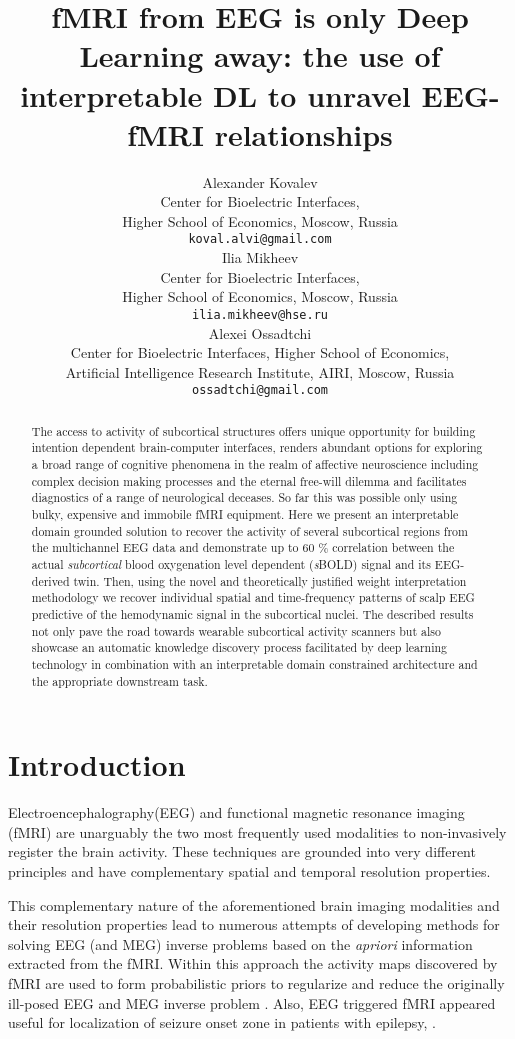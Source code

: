 \documentclass{article}
\title{ fMRI from EEG is only Deep Learning away: the use of interpretable DL to unravel EEG-fMRI relationships
}
\author{Alexander Kovalev\\
Center for Bioelectric Interfaces, \\ Higher School of Economics, Moscow, Russia \\  \texttt{koval.alvi@gmail.com} \\
   \And
   Ilia Mikheev\\
    Center for Bioelectric Interfaces, \\ Higher School of Economics, Moscow, Russia \\   \texttt{ilia.mikheev@hse.ru} \\
   \And
   Alexei Ossadtchi  \\
Center for Bioelectric Interfaces, Higher School of Economics, \\ 
Artificial Intelligence Research Institute, AIRI, Moscow, Russia  \\ \texttt{ossadtchi@gmail.com} \\
}
\begin{document}
\maketitle


\begin{abstract}

The access to activity of subcortical structures offers unique opportunity for building intention dependent brain-computer interfaces, renders abundant options for exploring a broad range of cognitive phenomena in the realm of affective neuroscience including complex decision making processes and the eternal free-will dilemma and facilitates diagnostics of a range of neurological deceases. So far this was possible only using bulky, expensive and immobile fMRI equipment. 
Here we present an interpretable domain grounded solution to recover the activity of several subcortical regions from the multichannel EEG data and demonstrate up to 60 $\%$ correlation between the actual \textit{subcortical} blood oxygenation level dependent (\textit{s}BOLD) signal and its EEG-derived twin. Then, using the novel and theoretically justified weight interpretation methodology we recover individual spatial and time-frequency patterns of scalp EEG predictive of the hemodynamic signal in the subcortical nuclei. 
The described results not only pave the road towards wearable subcortical activity scanners but also showcase an automatic knowledge discovery process facilitated by deep learning technology in combination with an interpretable domain constrained architecture and the appropriate downstream task. 

\end{abstract}

\section{Introduction}
Electroencephalography(EEG) and functional magnetic resonance imaging (fMRI) are unarguably the two most frequently used modalities to non-invasively register the brain activity. These techniques are grounded into very different principles and have complementary spatial and temporal resolution properties.  

This  complementary nature of the aforementioned brain imaging modalities and their resolution properties lead to numerous attempts of developing methods for solving EEG (and MEG) inverse problems based on the \textit{apriori} information extracted from the fMRI.  Within this approach the activity maps discovered by fMRI are used to form probabilistic priors to regularize and reduce the originally ill-posed EEG and MEG inverse problem \cite{megfmri}. Also, EEG triggered fMRI appeared useful for localization of seizure onset zone in patients with epilepsy, \cite{gotman2011combining}.  
\end{document}
